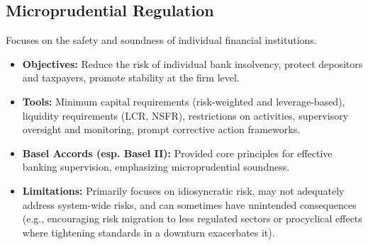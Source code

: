 \subsection{Microprudential Regulation}
Focuses on the safety and soundness of individual financial institutions.
\begin{itemize}
    \item \textbf{Objectives:} Reduce the risk of individual bank insolvency, protect depositors and taxpayers, promote stability at the firm level.
    \item \textbf{Tools:} Minimum capital requirements (risk-weighted and leverage-based), liquidity requirements (LCR, NSFR), restrictions on activities, supervisory oversight and monitoring, prompt corrective action frameworks.
    \item \textbf{Basel Accords (esp. Basel II):} Provided core principles for effective banking supervision, emphasizing microprudential soundness.
    \item \textbf{Limitations:} Primarily focuses on idiosyncratic risk, may not adequately address system-wide risks, and can sometimes have unintended consequences (e.g., encouraging risk migration to less regulated sectors or procyclical effects where tightening standards in a downturn exacerbates it).
\end{itemize}

